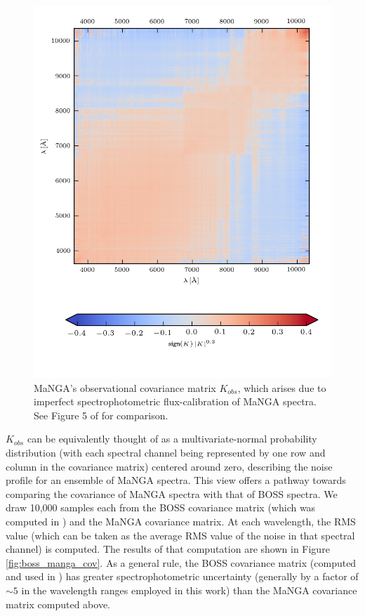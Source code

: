 \begin{figure}
    \centering
    \includegraphics[width=\columnwidth]{cov_obs_tremonti_small}
    \caption[Spectrophotometric covariance matrix]{\fixspacing MaNGA's observational covariance matrix $K_{obs}$, which arises due to imperfect spectrophotometric flux-calibration of MaNGA spectra. See Figure 5 of  for comparison.}
    \label{fig:cov_obs_manga}
\end{figure}

$K_{obs}$ can be equivalently thought of as a multivariate-normal probability distribution (with each spectral channel being represented by one row and column in the covariance matrix) centered around zero, describing the noise profile for an ensemble of MaNGA spectra. This view offers a pathway towards comparing the covariance of MaNGA spectra with that of BOSS spectra. We draw 10,000 samples each from the BOSS covariance matrix (which was computed in ) and the MaNGA covariance matrix. At each wavelength, the RMS value (which can be taken as the average RMS value of the noise in that spectral channel) is computed. The results of that computation are shown in Figure \ref{fig:boss_manga_cov}. As a general rule, the BOSS covariance matrix (computed and used in ) has greater spectrophotometric uncertainty (generally by a factor of $\sim 5$ in the wavelength ranges employed in this work) than the MaNGA covariance matrix computed above.

